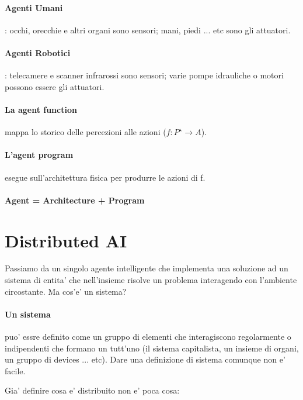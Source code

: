 
\paragraph{Agenti Umani}: occhi, orecchie e altri organi sono sensori; mani, piedi ... etc sono gli attuatori.

\paragraph{Agenti Robotici}: telecamere e scanner infrarossi sono sensori; varie pompe idrauliche o motori possono essere gli attuatori.

\paragraph{La agent function} mappa lo storico delle percezioni alle azioni ($f: P^\star \rightarrow A$).

\paragraph{L'agent program} esegue sull'architettura fisica per produrre le azioni di f.

\paragraph{Agent = Architecture + Program}

\section{Distributed AI}

Passiamo da un singolo agente intelligente che implementa una soluzione ad un sistema di entita' che nell'insieme risolve un problema interagendo con l'ambiente circostante.
Ma cos'e' un sistema?

\paragraph{Un sistema} puo' essre definito come un gruppo di elementi che interagiscono regolarmente o indipendenti che formano un tutt'uno (il sistema capitalista, un insieme di organi, un gruppo di devices ... etc).
Dare una definizione di sistema comunque non e' facile.

Gia' definire cosa e' distribuito non e' poca cosa:

